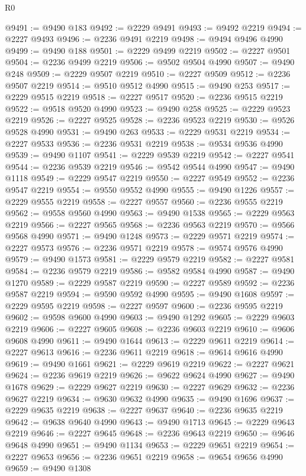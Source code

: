 \begin{lexlean}{R0}
\begin{coremodule}
@9491 := @9490 @183
@9492 := @2229 @9491
@9493 := @9492 @2219
@9494 := @2227 @9493
@9496 := @2236 @9491 @2219
@9498 := @9494 @9496 @4990
@9499 := @9490 @188
@9501 := @2229 @9499 @2219
@9502 := @2227 @9501
@9504 := @2236 @9499 @2219
@9506 := @9502 @9504 @4990
@9507 := @9490 @248
@9509 := @2229 @9507 @2219
@9510 := @2227 @9509
@9512 := @2236 @9507 @2219
@9514 := @9510 @9512 @4990
@9515 := @9490 @253
@9517 := @2229 @9515 @2219
@9518 := @2227 @9517
@9520 := @2236 @9515 @2219
@9522 := @9518 @9520 @4990
@9523 := @9490 @258
@9525 := @2229 @9523 @2219
@9526 := @2227 @9525
@9528 := @2236 @9523 @2219
@9530 := @9526 @9528 @4990
@9531 := @9490 @263
@9533 := @2229 @9531 @2219
@9534 := @2227 @9533
@9536 := @2236 @9531 @2219
@9538 := @9534 @9536 @4990
@9539 := @9490 @1107
@9541 := @2229 @9539 @2219
@9542 := @2227 @9541
@9544 := @2236 @9539 @2219
@9546 := @9542 @9544 @4990
@9547 := @9490 @1118
@9549 := @2229 @9547 @2219
@9550 := @2227 @9549
@9552 := @2236 @9547 @2219
@9554 := @9550 @9552 @4990
@9555 := @9490 @1226
@9557 := @2229 @9555 @2219
@9558 := @2227 @9557
@9560 := @2236 @9555 @2219
@9562 := @9558 @9560 @4990
@9563 := @9490 @1538
@9565 := @2229 @9563 @2219
@9566 := @2227 @9565
@9568 := @2236 @9563 @2219
@9570 := @9566 @9568 @4990
@9571 := @9490 @1248
@9573 := @2229 @9571 @2219
@9574 := @2227 @9573
@9576 := @2236 @9571 @2219
@9578 := @9574 @9576 @4990
@9579 := @9490 @1573
@9581 := @2229 @9579 @2219
@9582 := @2227 @9581
@9584 := @2236 @9579 @2219
@9586 := @9582 @9584 @4990
@9587 := @9490 @1270
@9589 := @2229 @9587 @2219
@9590 := @2227 @9589
@9592 := @2236 @9587 @2219
@9594 := @9590 @9592 @4990
@9595 := @9490 @1608
@9597 := @2229 @9595 @2219
@9598 := @2227 @9597
@9600 := @2236 @9595 @2219
@9602 := @9598 @9600 @4990
@9603 := @9490 @1292
@9605 := @2229 @9603 @2219
@9606 := @2227 @9605
@9608 := @2236 @9603 @2219
@9610 := @9606 @9608 @4990
@9611 := @9490 @1644
@9613 := @2229 @9611 @2219
@9614 := @2227 @9613
@9616 := @2236 @9611 @2219
@9618 := @9614 @9616 @4990
@9619 := @9490 @1661
@9621 := @2229 @9619 @2219
@9622 := @2227 @9621
@9624 := @2236 @9619 @2219
@9626 := @9622 @9624 @4990
@9627 := @9490 @1678
@9629 := @2229 @9627 @2219
@9630 := @2227 @9629
@9632 := @2236 @9627 @2219
@9634 := @9630 @9632 @4990
@9635 := @9490 @1696
@9637 := @2229 @9635 @2219
@9638 := @2227 @9637
@9640 := @2236 @9635 @2219
@9642 := @9638 @9640 @4990
@9643 := @9490 @1713
@9645 := @2229 @9643 @2219
@9646 := @2227 @9645
@9648 := @2236 @9643 @2219
@9650 := @9646 @9648 @4990
@9651 := @9490 @1134
@9653 := @2229 @9651 @2219
@9654 := @2227 @9653
@9656 := @2236 @9651 @2219
@9658 := @9654 @9656 @4990
@9659 := @9490 @1308

\end{coremodule}
\end{lexlean}
